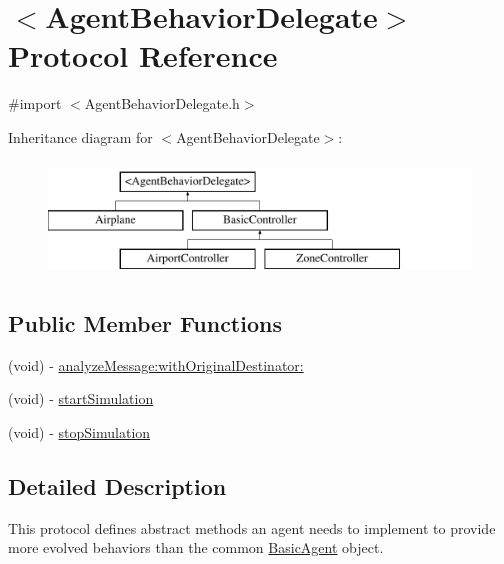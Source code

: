 \hypertarget{protocol_agent_behavior_delegate-p}{
\section{$<$\-Agent\-Behavior\-Delegate$>$ \-Protocol \-Reference}
\label{protocol_agent_behavior_delegate-p}
}


{\ttfamily \#import $<$\-Agent\-Behavior\-Delegate.\-h$>$}

\-Inheritance diagram for $<$\-Agent\-Behavior\-Delegate$>$\-:\begin{figure}[H]
\begin{center}
\leavevmode
\includegraphics[height=3.000000cm]{protocol_agent_behavior_delegate-p}
\end{center}
\end{figure}
\subsection*{\-Public \-Member \-Functions}
\begin{DoxyCompactItemize}
\item 
(void) -\/ \hyperlink{protocol_agent_behavior_delegate-p_ac4e1d47826a7916c7a454ca1b7aa2e79}{analyze\-Message\-:with\-Original\-Destinator\-:}
\item 
(void) -\/ \hyperlink{protocol_agent_behavior_delegate-p_ae65ac71cad3f34ea837b363f3eb53966}{start\-Simulation}
\item 
(void) -\/ \hyperlink{protocol_agent_behavior_delegate-p_a9177a82f871c00aa7513cbf5d0cb8ca5}{stop\-Simulation}
\end{DoxyCompactItemize}


\subsection{\-Detailed \-Description}
\-This protocol defines abstract methods an agent needs to implement to provide more evolved behaviors than the common \hyperlink{interface_basic_agent}{\-Basic\-Agent} object. 

